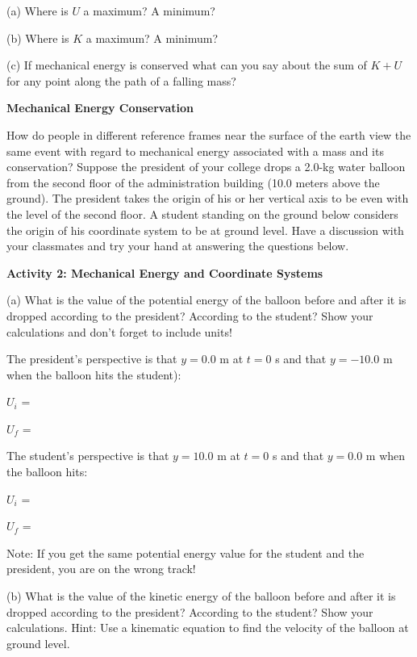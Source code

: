(a) Where is $U$ a maximum? A minimum?
\vspace{20mm}

(b) Where is $K$ a maximum? A minimum?
\vspace{20mm}

(c) If mechanical energy is conserved what can you say about the sum of $K+ U$ 
for any point along the path of a falling mass?
\vspace{20mm}


\textbf{Mechanical Energy Conservation }

How do people in different reference frames near the surface of the earth view
the same event with regard to mechanical energy associated with a mass and its
conservation? Suppose the president of your college drops a 2.0-kg 
water balloon
from the second floor of the administration building (10.0 meters above the
ground). The president takes the origin of his or her vertical axis to be even
with the level of the second floor. A student standing on the ground below considers
the origin of his coordinate system to be at ground level. Have a discussion
with your classmates and try your hand at answering the questions below.

\textbf{Activity 2: Mechanical Energy and Coordinate Systems} 

(a) What is the value of the potential energy of the balloon before and after
it is dropped according to the president? According to the student? Show your
calculations and don't forget to include units!

The president's perspective is that $y = 0.0$ m at $t = 0$ s and that 
$y = -10.0$ m
when the balloon hits the student): 
\vspace{5mm}

\( U_{i} \) = 
\vspace{5mm}

\( U_{f} \) =
\vspace{5mm}

The student's perspective is that $y = 10.0$ m at $t = 0$ s and that 
$y = 0.0$ m when
the balloon hits: 
\vspace{5mm}

\( U_{i} \) = 
\vspace{5mm}

\( U_{f} \) =
\vspace{5mm}

Note: If you get the same potential energy value for the student and the president,
you are on the wrong track!

(b) What is the value of the kinetic energy of the balloon before and after
it is dropped according to the president? According to the student? Show your
calculations. Hint: Use a kinematic equation to find the velocity of the balloon
at ground level.

